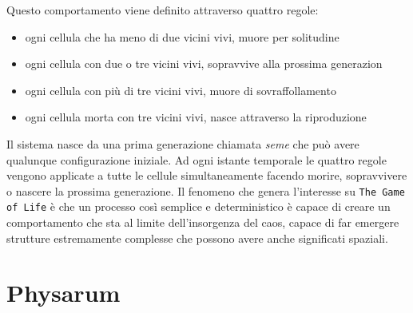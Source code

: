 \par
Questo comportamento viene definito attraverso quattro regole:
\begin{itemize}
\item ogni cellula che ha meno di due vicini vivi, muore per solitudine
\item ogni cellula con due o tre vicini vivi, sopravvive alla prossima generazion
\item ogni cellula con più di tre vicini vivi, muore di sovraffollamento
\item ogni cellula morta con tre vicini vivi, nasce attraverso la riproduzione
\end{itemize}
\par
Il sistema nasce da una prima generazione chiamata \textit{seme} che può avere qualunque configurazione iniziale. Ad ogni istante temporale le quattro regole vengono applicate a tutte le cellule simultaneamente facendo morire, sopravvivere o nascere la prossima generazione. Il fenomeno che genera l’interesse su \texttt{The Game of Life} è che un processo così semplice e deterministico è capace di creare un comportamento che sta al limite dell’insorgenza del caos, capace di far emergere strutture estremamente complesse che possono avere anche significati spaziali.


\section{Physarum}

